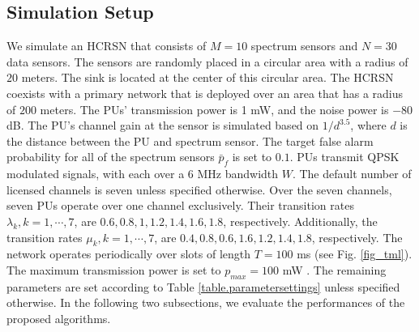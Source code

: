 \documentclass[journal]{IEEEtran} \ifCLASSINFOpdf
\begin{document}
\subsection{Simulation Setup} \label{sec:par_setting}
We simulate an HCRSN that consists of $M = 10$ spectrum sensors and $N = 30$ data sensors. The sensors are randomly placed in a circular area with a radius of $20$ meters. The sink is located at the center of this circular area. The HCRSN coexists with a primary network that is deployed over an area that has a radius of $200$ meters. The PUs' transmission power is 1 mW, and the noise power is $-80$ dB. The PU's channel gain at the sensor is simulated based on $1/d^{3.5}$, where $d$ is the distance between the PU and spectrum sensor. The target false alarm probability for all of the spectrum sensors $\bar{p}_f$ is set to $0.1$. PUs transmit QPSK modulated signals, with each over a $6$ MHz bandwidth $W$. The default number of licensed channels is seven unless specified otherwise. Over the seven channels, seven PUs operate over one channel exclusively. Their transition rates $\lambda_k, k=1, \cdots, 7$, are $0.6, 0.8, 1, 1.2, 1.4, 1.6, 1.8$, respectively. Additionally, the transition rates $\mu_k, k=1, \cdots, 7$, are $0.4, 0.8, 0.6, 1.6, 1.2, 1.4, 1.8$, respectively. The network operates periodically over slots of length $T=100$ ms \cite{Pei2011} (see Fig. \ref{fig_tml}). The maximum transmission power is set to $p_{max} = 100$ mW \cite{Shu2006}. The remaining parameters are set according to Table \ref{table.parametersettings} unless specified otherwise. In the following two subsections, we evaluate the performances of the proposed algorithms.
\end{document}
